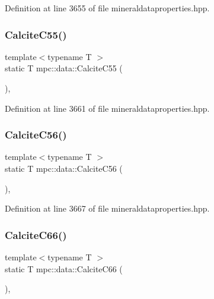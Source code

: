 Definition at line 3655 of file mineraldataproperties.\+hpp.

\mbox{\label{namespacempc_1_1data_ae6cfe5802e6fba0ed8f3343d82d32be0}} 
\subsubsection{\texorpdfstring{Calcite\+C55()}{CalciteC55()}}
{\footnotesize\ttfamily template$<$typename T $>$ \\
static T mpc\+::data\+::\+Calcite\+C55 (\begin{DoxyParamCaption}{ }\end{DoxyParamCaption})\hspace{0.3cm}{\ttfamily [inline]}, {\ttfamily [static]}}



Definition at line 3661 of file mineraldataproperties.\+hpp.

\mbox{\label{namespacempc_1_1data_a1670006faa5fda3c603812b4d414ff17}} 
\subsubsection{\texorpdfstring{Calcite\+C56()}{CalciteC56()}}
{\footnotesize\ttfamily template$<$typename T $>$ \\
static T mpc\+::data\+::\+Calcite\+C56 (\begin{DoxyParamCaption}{ }\end{DoxyParamCaption})\hspace{0.3cm}{\ttfamily [inline]}, {\ttfamily [static]}}



Definition at line 3667 of file mineraldataproperties.\+hpp.

\mbox{\label{namespacempc_1_1data_a5575e0cad4cf8779b1acede8e2117d06}} 
\subsubsection{\texorpdfstring{Calcite\+C66()}{CalciteC66()}}
{\footnotesize\ttfamily template$<$typename T $>$ \\
static T mpc\+::data\+::\+Calcite\+C66 (\begin{DoxyParamCaption}{ }\end{DoxyParamCaption})\hspace{0.3cm}{\ttfamily [inline]}, {\ttfamily [static]}}



